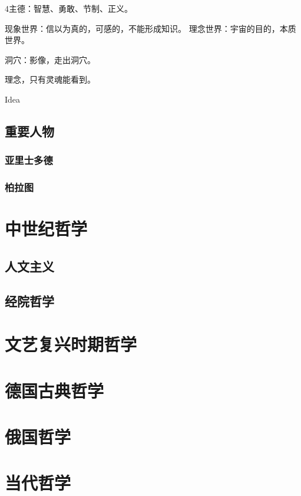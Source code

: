 \documentclass[UTF8]{../RepresentationUniverse}
\begin{document}
        4主德：智慧、勇敢、节制、正义。

        现象世界：信以为真的，可感的，不能形成知识。
        理念世界：宇宙的目的，本质世界。

        洞穴：影像，走出洞穴。

        理念，只有灵魂能看到。

        Idea







        \subsection{重要人物}


        \subsubsection{亚里士多德}
        \subsubsection{柏拉图}

    \section{中世纪哲学}
    \subsection{人文主义}
    \subsection{经院哲学}

    \section{文艺复兴时期哲学}

    \section{德国古典哲学}
    \section{俄国哲学}
    

    
    \section{当代哲学}
\end{document}
